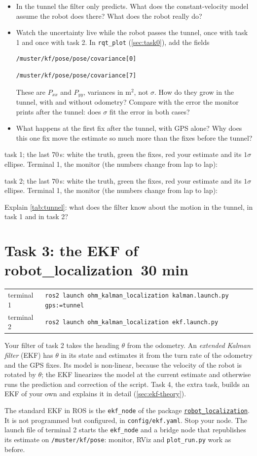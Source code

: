 \documentclass[11pt,a4paper,parskip=half]{scrartcl}
\makeatletter
\newcommand{\thema}[1]{\texttt{#1}}
\newcommand{\datei}[1]{\texttt{#1}}
\newcommand{\minutes}[1]{\texorpdfstring{\hfill{\normalsize\mdseries\color{ohmgrey}\faClock[regular]~#1 min}}{}}
\newcommand{\solution}[1]{\ifdefined\withsolution\InputIfFileExists{solutions/#1}{}{}\fi}
\newcommand{\runningekf}[1]{\begin{tcolorbox}[base, colback=black!3, borderline west={2.5pt}{0pt}{ohmgrey},
        title={\faTerminal~Running}, coltitle=ohmgrey, colbacktitle=black!3, fonttitle=\small\bfseries,
        toptitle=2pt, bottomtitle=0pt, fontupper=\small]
  \begin{tabularx}{\linewidth}{@{}>{\color{ohmgrey}}l >{\raggedright\arraybackslash}X@{}}
    terminal 1 & \texttt{ros2 launch ohm\_kalman\_localization kalman.launch.py#1} \\
    terminal 2 & \texttt{ros2 launch ohm\_kalman\_localization ekf.launch.py}
  \end{tabularx}
\end{tcolorbox}}
\newcommand{\expected}[2][]{\begin{seebox}
  \centering\resizebox{0.5\linewidth}{!}{}\par\smallskip
  \raggedright{\footnotesize\color{ohmgrey}#1the last 70\,s: white the truth, green the fixes, red your
    estimate and its \(1\sigma\) ellipse. Terminal 1, the monitor (the numbers change from lap to lap):}
  
\end{seebox}}
\makeatother
\begin{document}
\begin{itemize}
  \item In the tunnel the filter only predicts. What does the constant-velocity model assume the robot does
        there? What does the robot really do?
  \item Watch the uncertainty live while the robot passes the tunnel, once with task 1 and once with task 2. In
        \thema{rqt\_plot} (\cref{sec:task0}), add the fields
\begin{lstlisting}
/muster/kf/pose/pose/covariance[0]
\end{lstlisting}
\begin{lstlisting}
/muster/kf/pose/pose/covariance[7]
\end{lstlisting}
        These are \(P_{xx}\) and \(P_{yy}\), variances in m\(^2\), not \(\sigma\). How do they grow in the tunnel,
        with and without odometry? Compare with the error the monitor prints after the tunnel: does \(\sigma\)
        fit the error in both cases?
  \item What happens at the first fix after the tunnel, with GPS alone? Why does this one fix move the
        estimate so much more than the fixes before the tunnel?
\end{itemize}

\expected[task 1; ]{tunnel1}
\expected[task 2; ]{tunnel2}

\begin{checkpoint}
Explain \cref{tab:tunnel}: what does the filter know about the motion in the tunnel, in task 1 and in task 2?
\end{checkpoint}
\solution{task2b}

\newpage
\section{Task 3: the EKF of robot\_localization\minutes{30}}
\label{sec:task3}
\runningekf{ gps:=tunnel}

Your filter of task 2 takes the heading \(\theta\) from the odometry. An \emph{extended Kalman filter} (EKF) has
\(\theta\) in its state and estimates it from the turn rate of the odometry and the GPS fixes. Its model is
non-linear, because the velocity of the robot is rotated by \(\theta\); the EKF linearizes the model at the
current estimate and otherwise runs the prediction and correction of the script. Task 4, the extra task,
builds an EKF of your own and explains it in detail (\cref{sec:ekf-theory}).

The standard EKF in ROS is the \thema{ekf\_node} of the package
\href{https://docs.ros.org/en/rolling/p/robot_localization/}{\thema{robot\_localization}}. It is not
programmed but configured, in \datei{config/ekf.yaml}. Stop your node. The launch file of terminal 2 starts the
\thema{ekf\_node} and a bridge node that republishes its estimate on
\thema{/muster/kf/pose}: monitor, RViz and \thema{plot\_run.py} work as before.
\end{document}

